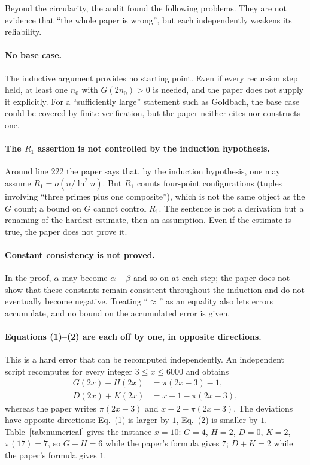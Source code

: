 \documentclass[11pt,a4paper]{article}
\theoremstyle{plain}
\theoremstyle{definition}
\begin{document}
Beyond the circularity, the audit found the following problems. They are not evidence that ``the whole paper is wrong'', but each independently weakens its reliability.

\paragraph{No base case.}
The inductive argument provides no starting point. Even if every recursion step held, at least one $n_0$ with $G(2n_0)>0$ is needed, and the paper does not supply it explicitly. For a ``sufficiently large'' statement such as Goldbach, the base case could be covered by finite verification, but the paper neither cites nor constructs one.

\paragraph{The $R_1$ assertion is not controlled by the induction hypothesis.}
Around line 222 the paper says that, by the induction hypothesis, one may assume $R_1=o(n/\ln^2 n)$. But $R_1$ counts four-point configurations (tuples involving ``three primes plus one composite''), which is not the same object as the $G$ count; a bound on $G$ cannot control $R_1$. The sentence is not a derivation but a renaming of the hardest estimate, then an assumption. Even if the estimate is true, the paper does not prove it.

\paragraph{Constant consistency is not proved.}
In the proof, $\alpha$ may become $\alpha-\beta$ and so on at each step; the paper does not show that these constants remain consistent throughout the induction and do not eventually become negative. Treating ``$\approx$'' as an equality also lets errors accumulate, and no bound on the accumulated error is given.

\paragraph{Equations (1)--(2) are each off by one, in opposite directions.}
This is a hard error that can be recomputed independently. An independent script recomputes for every integer $3\le x\le6000$ and obtains
\begin{align}
G(2x)+H(2x)&=\pi(2x-3)-1, \label{eq:true1}\\
D(2x)+K(2x)&=x-1-\pi(2x-3), \label{eq:true2}
\end{align}
whereas the paper writes $\pi(2x-3)$ and $x-2-\pi(2x-3)$. The deviations have opposite directions: Eq.~(1) is larger by $1$, Eq.~(2) is smaller by $1$. Table~\ref{tab:numerical} gives the instance $x=10$: $G=4$, $H=2$, $D=0$, $K=2$, $\pi(17)=7$, so $G+H=6$ while the paper's formula gives $7$; $D+K=2$ while the paper's formula gives $1$.
\end{document}
